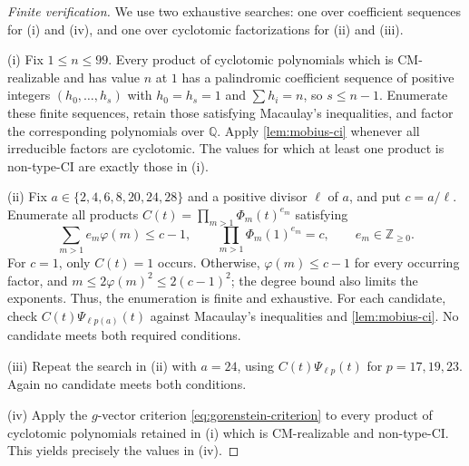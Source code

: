 \documentclass[11pt,a4paper]{amsart}
\theoremstyle{definition}
\theoremstyle{remark}
\newcommand{\ZZ}{\mathbb Z}
\newcommand{\QQ}{\mathbb Q}
\newcommand{\ph}{\varphi}
\begin{document}
\begin{proof}[Finite verification]
We use two exhaustive searches: one over coefficient sequences for \textup{(i)} and \textup{(iv)}, and one over cyclotomic factorizations for \textup{(ii)} and \textup{(iii)}.

\noindent\textup{(i)} Fix $1\le n\le99$. Every product of cyclotomic polynomials which is CM-realizable and has value $n$ at $1$ has a palindromic coefficient sequence of positive integers $(h_0,\ldots,h_s)$ with $h_0=h_s=1$ and $\sum h_i=n$, so $s\le n-1$. Enumerate these finite sequences, retain those satisfying Macaulay's inequalities, and factor the corresponding polynomials over $\QQ$. Apply \cref{lem:mobius-ci} whenever all irreducible factors are cyclotomic. The values for which at least one product is non-type-CI are exactly those in \textup{(i)}.

\noindent\textup{(ii)} Fix $a\in\{2,4,6,8,20,24,28\}$ and a positive divisor $\ell$ of $a$, and put $c=a/\ell$. Enumerate all products $C(t)=\prod_{m>1}\Phi_m(t)^{e_m}$ satisfying
\[\sum_{m>1}e_m\ph(m)\le c-1,\qquad \prod_{m>1}\Phi_m(1)^{e_m}=c,\qquad e_m\in\ZZ_{\ge0}.\]
For $c=1$, only $C(t)=1$ occurs. Otherwise, $\ph(m)\le c-1$ for every occurring factor, and $m\le2\ph(m)^2\le2(c-1)^2$; the degree bound also limits the exponents. Thus, the enumeration is finite and exhaustive. For each candidate, check $C(t)\Psi_{\ell p(a)}(t)$ against Macaulay's inequalities and \cref{lem:mobius-ci}. No candidate meets both required conditions.

\noindent\textup{(iii)} Repeat the search in \textup{(ii)} with $a=24$, using $C(t)\Psi_{\ell p}(t)$ for $p=17,19,23$. Again no candidate meets both conditions.

\noindent\textup{(iv)} Apply the $g$-vector criterion \eqref{eq:gorenstein-criterion} to every product of cyclotomic polynomials retained in \textup{(i)} which is CM-realizable and non-type-CI. This yields precisely the values in \textup{(iv)}.
\end{proof}
\end{document}
